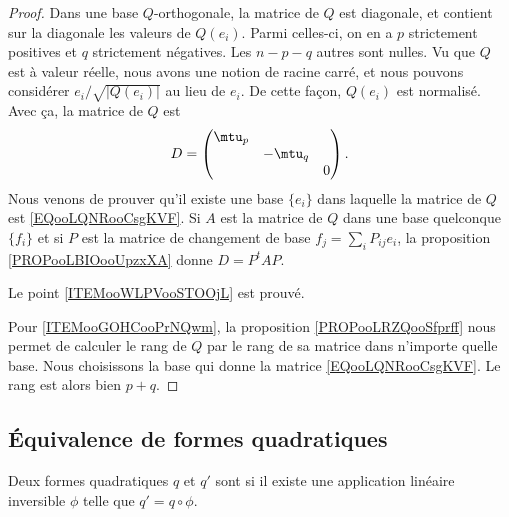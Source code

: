 \begin{proof}
	Dans une base \( Q\)-orthogonale, la matrice de \( Q\) est diagonale, et contient sur la diagonale les valeurs de \( Q(e_i)\). Parmi celles-ci, on en a \( p\) strictement positives et \( q\) strictement négatives. Les \( n-p-q\) autres sont nulles. Vu que \( Q\) est à valeur réelle, nous avons une notion de racine carré, et nous pouvons considérer \( e_i/\sqrt{ | Q(e_i) | }\) au lieu de \( e_i\). De cette façon, \( Q(e_i)\) est normalisé. Avec ça, la matrice de \( Q\) est
	\begin{equation}        \label{EQooLQNRooCsgKVF}
		D=\begin{pmatrix}
			\mtu_p &         &   \\
			       & -\mtu_q &   \\
			       &         & 0
		\end{pmatrix}.
	\end{equation}
	Nous venons de prouver qu'il existe une base \( \{ e_i \}\) dans laquelle la matrice de \( Q\) est \eqref{EQooLQNRooCsgKVF}. Si \( A\) est la matrice de \( Q\) dans une base quelconque \( \{ f_i \}\) et si \( P\) est la matrice de changement de base \( f_j=\sum_iP_{ij}e_i\), la proposition \ref{PROPooLBIOooUpzxXA} donne \(D= P^tAP\).

	Le point \ref{ITEMooWLPVooSTOOjL} est prouvé.

	Pour \ref{ITEMooGOHCooPrNQwm}, la proposition \ref{PROPooLRZQooSfprff} nous permet de calculer le rang de \( Q\) par le rang de sa matrice dans n'importe quelle base. Nous choisissons la base qui donne la matrice \eqref{EQooLQNRooCsgKVF}. Le rang est alors bien \( p+q\).
\end{proof}


\subsection{Équivalence de formes quadratiques}

\begin{definition}        \label{DEFooOLWYooMwhMJp}
	Deux formes quadratiques \( q\) et \( q'\) sont  si il existe une application linéaire inversible \( \phi\) telle que \( q'=q\circ \phi\).
\end{definition}

